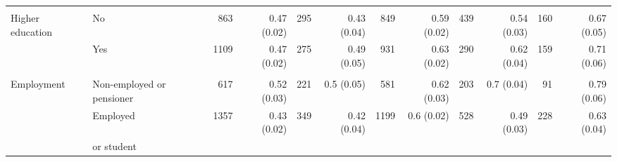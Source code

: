 \begin{tabular}{p{1.3in}p{1.1in}rrrrrrrrrr}
	\vspace{1pt}\\
Higher education & No & 863 & 0.47 (0.02) & 295 & 0.43 (0.04) & 849 & 0.59 (0.02) & 439 & 0.54 (0.03) & 160 & 0.67 (0.05) \\ 
& Yes & 1109 & 0.47 (0.02) & 275 & 0.49 (0.05) & 931 & 0.63 (0.02) & 290 & 0.62 (0.04) & 159 & 0.71 (0.06) \\ 
	\vspace{1pt}\\
Employment & Non-employed or pensioner & 617 & 0.52 (0.03) & 221 & 0.5 (0.05) & 581 & 0.62 (0.03) & 203 & 0.7 (0.04) & 91 & 0.79 (0.06) \\ 
& Employed & 1357 & 0.43 (0.02) & 349 & 0.42 (0.04) & 1199 & 0.6 (0.02) & 528 & 0.49 (0.03) & 228 & 0.63 (0.04) \\ 
& or student \\


\end{tabular}
